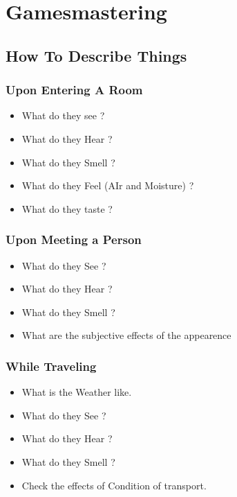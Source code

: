 \chapter{Gamesmastering}

\section{How To Describe Things}

\subsection{Upon Entering A Room}

\begin{itemize}
    \item What do they see ?
    \item What do they Hear ?
    \item What do they Smell ?
    \item What do they Feel (AIr and Moisture) ?
    \item What do they taste ?
\end{itemize}

\subsection{Upon Meeting a Person }

\begin{itemize}
    \item What do they See ? 
    \item What do they Hear ?
    \item What do they Smell ?
    \item What are the subjective effects of the appearence
\end{itemize}

\subsection{While Traveling}

\begin{itemize}
    \item What is the Weather like.
    \item What do they See ? 
    \item What do they Hear ?
    \item What do they Smell ?
	\item Check the effects of Condition of transport.
\end{itemize}



